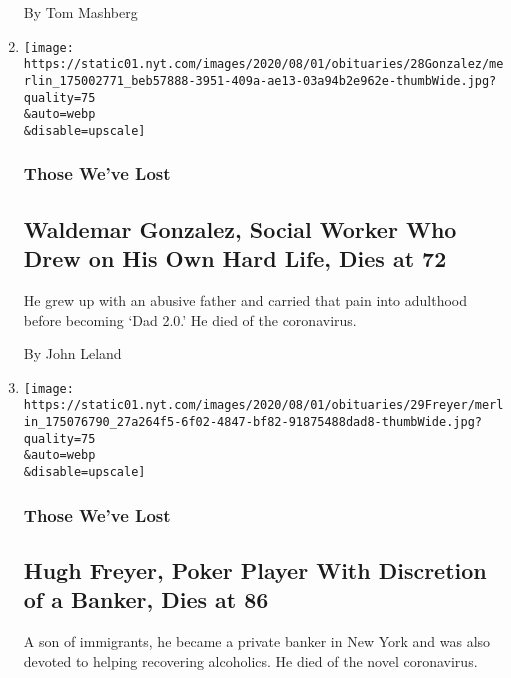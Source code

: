 \begin{enumerate}
  By Tom Mashberg
\item
  \href{/2020/07/30/obituaries/waldemar-gonzalez-dead-coronavirus.html}{}

  \texttt{[image: https://static01.nyt.com/images/2020/08/01/obituaries/28Gonzalez/merlin\_175002771\_beb57888-3951-409a-ae13-03a94b2e962e-thumbWide.jpg?quality=75\\\&auto=webp\\\&disable=upscale]}

  \hypertarget{those-weve-lost-1}{%
  \subsubsection{Those We've Lost}\label{those-weve-lost-1}}

  \hypertarget{waldemar-gonzalez-social-worker-who-drew-on-his-own-hard-life-dies-at-72}{%
  \subsection{Waldemar Gonzalez, Social Worker Who Drew on His Own Hard
  Life, Dies at
  72}\label{waldemar-gonzalez-social-worker-who-drew-on-his-own-hard-life-dies-at-72}}

  He grew up with an abusive father and carried that pain into adulthood
  before becoming `Dad 2.0.' He died of the coronavirus.

  By John Leland
\item
  \href{/2020/07/30/obituaries/hugh-freyer-dead-coronavirus.html}{}

  \texttt{[image: https://static01.nyt.com/images/2020/08/01/obituaries/29Freyer/merlin\_175076790\_27a264f5-6f02-4847-bf82-91875488dad8-thumbWide.jpg?quality=75\\\&auto=webp\\\&disable=upscale]}

  \hypertarget{those-weve-lost-2}{%
  \subsubsection{Those We've Lost}\label{those-weve-lost-2}}

  \hypertarget{hugh-freyer-poker-player-with-discretion-of-a-banker-dies-at-86-1}{%
  \subsection{Hugh Freyer, Poker Player With Discretion of a Banker,
  Dies at
  86}\label{hugh-freyer-poker-player-with-discretion-of-a-banker-dies-at-86-1}}

  A son of immigrants, he became a private banker in New York and was
  also devoted to helping recovering alcoholics. He died of the novel
  coronavirus.


\end{enumerate}
